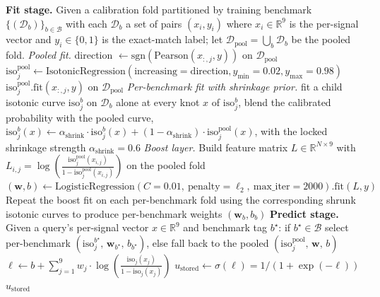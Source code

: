 \begin{algorithm}[!htbp]
\caption[Calibrated probability composite (fit and predict).]{Calibrated probability composite (fit and predict).}
\label{alg:composite}
\begin{algorithmic}[1]
\Statex \textbf{Fit stage.} Given a calibration fold partitioned by training benchmark $\{(\mathcal{D}_{b})\}_{b\in\mathcal{B}}$ with each $\mathcal{D}_{b}$ a set of pairs $(x_{i}, y_{i})$ where $x_{i}\in\mathbb{R}^{9}$ is the per-signal vector and $y_{i}\in\{0,1\}$ is the exact-match label; let $\mathcal{D}_{\text{pool}} = \bigcup_{b}\mathcal{D}_{b}$ be the pooled fold.
\Statex \emph{Pooled fit.}
    \State direction $\gets \mathrm{sgn}\!\left(\mathrm{Pearson}(x_{:,j}, y)\right)$ on $\mathcal{D}_{\text{pool}}$ 
    \State $\mathrm{iso}^{\text{pool}}_{j} \gets \mathrm{IsotonicRegression}(\text{increasing}=\text{direction}, y_{\min}{=}0.02, y_{\max}{=}0.98)$
    \State $\mathrm{iso}^{\text{pool}}_{j}.\mathrm{fit}(x_{:,j}, y)$ on $\mathcal{D}_{\text{pool}}$
\EndFor
\Statex \emph{Per-benchmark fit with shrinkage prior.}
    \State fit a child isotonic curve $\mathrm{iso}^{b}_{j}$ on $\mathcal{D}_{b}$ alone
    \State at every knot $x$ of $\mathrm{iso}^{b}_{j}$, blend the calibrated probability with the pooled curve, $\mathrm{iso}^{b}_{j}(x) \gets \alpha_{\text{shrink}}\cdot\mathrm{iso}^{b}_{j}(x) + (1-\alpha_{\text{shrink}})\cdot\mathrm{iso}^{\text{pool}}_{j}(x)$, with the locked shrinkage strength $\alpha_{\text{shrink}}=0.6$
\EndFor
\Statex \emph{Boost layer.}
\State Build feature matrix $L \in \mathbb{R}^{N\times 9}$ with $L_{i,j} = \log\!\left(\tfrac{\mathrm{iso}^{\text{pool}}_{j}(x_{i,j})}{1-\mathrm{iso}^{\text{pool}}_{j}(x_{i,j})}\right)$ on the pooled fold
\State $(\mathbf{w}, b) \gets \mathrm{LogisticRegression}(C{=}0.01,\ \text{penalty}=\ell_{2},\ \text{max\_iter}{=}2000).\mathrm{fit}(L, y)$
\State Repeat the boost fit on each per-benchmark fold using the corresponding shrunk isotonic curves to produce per-benchmark weights $(\mathbf{w}_{b}, b_{b})$
\Statex \textbf{Predict stage.} Given a query's per-signal vector $x \in \mathbb{R}^{9}$ and benchmark tag $b^{\star}$:
\State if $b^{\star}\in\mathcal{B}$ select per-benchmark $(\mathrm{iso}^{b^{\star}}_{j},\, \mathbf{w}_{b^{\star}},\, b_{b^{\star}})$, else fall back to the pooled $(\mathrm{iso}^{\text{pool}}_{j},\,\mathbf{w},\,b)$
\State $\ell \gets b + \sum_{j=1}^{9} w_{j}\cdot\log\!\left(\tfrac{\mathrm{iso}_{j}(x_{j})}{1-\mathrm{iso}_{j}(x_{j})}\right)$
\State $u_{\text{stored}} \gets \sigma(\ell) = 1 / (1 + \exp(-\ell))$
\State \Return $u_{\text{stored}}$
\end{algorithmic}
\end{algorithm}

